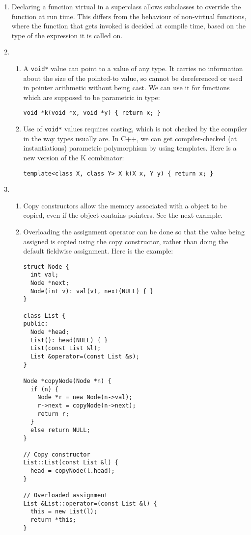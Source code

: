 \documentclass{article}
\begin{document}
\begin{enumerate}
\begin{enumerate}
\begin{enumerate}
        \end{enumerate}
      \item Declaring a function virtual in a superclass allows subclasses to override the function at run time. This differs from the behaviour of non-virtual functions, where the function that gets invoked is decided at compile time, based on the type of the expression it is called on.
      \item
        \begin{enumerate}
          \item A \texttt{void*} value can point to a value of any type. It carries no information about the size of the pointed-to value, so cannot be dereferenced or used in pointer arithmetic without being cast. We can use it for functions which are supposed to be parametric in type:
            \begin{lstlisting}
void *k(void *x, void *y) { return x; }
            \end{lstlisting}
          \item Use of \texttt{void*} values requires casting, which is not checked by the compiler in the way types usually are. In C++, we can get compiler-checked (at instantiations) parametric polymorphism by using templates. Here is a new version of the K combinator:
            \begin{lstlisting}
template<class X, class Y> X k(X x, Y y) { return x; }
            \end{lstlisting}
        \end{enumerate}
      \item
        \begin{enumerate}
          \item Copy constructors allow the memory associated with a object to be copied, even if the object contains pointers. See the next example.
          \item Overloading the assignment operator can be done so that the value being assigned is copied using the copy constructor, rather than doing the default fieldwise assignment. Here is the example:
            \begin{lstlisting}
struct Node {
  int val;
  Node *next;
  Node(int v): val(v), next(NULL) { }
}

class List {
public:
  Node *head;
  List(): head(NULL) { }
  List(const List &l);
  List &operator=(const List &s);
}

Node *copyNode(Node *n) {
  if (n) {
    Node *r = new Node(n->val);
    r->next = copyNode(n->next);
    return r;
  }
  else return NULL;
}

// Copy constructor
List::List(const List &l) {
  head = copyNode(l.head);
}

// Overloaded assignment
List &List::operator=(const List &l) {
  this = new List(l);
  return *this;
}
            \end{lstlisting}
        \end{enumerate}
    \end{enumerate}
\end{enumerate}
\end{document}
